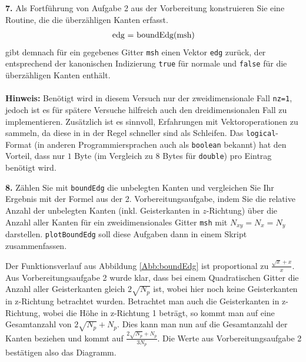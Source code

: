 \documentclass[Protokollheft.tex]{subfiles}
\begin{document}
        \begin{framed}
	\noindent \textbf{7.} Als Fortführung von Aufgabe 2 aus der Vorbereitung
                    konstruieren Sie eine Routine, die die überzähligen Kanten erfasst.
                    \begin{align}
                        \lstinline{edg = boundEdg(msh)}
                    \end{align}
                    gibt demnach für ein gegebenes Gitter \lstinline{msh} einen Vektor \lstinline{edg} zurück, der
                    entsprechend der kanonischen Indizierung \lstinline{true} für normale und \lstinline{false}
                    für die überzähligen Kanten enthält.\\
                    \ \\
                    {\textbf{Hinweis:}} Benötigt wird in diesem Versuch nur der zweidimensionale Fall \lstinline{nz=1}, jedoch ist es für spätere Versuche hilfreich auch den dreidimensionalen Fall zu implementieren. Zusätzlich ist es sinnvoll, Erfahrungen mit Vektoroperationen zu sammeln, da diese in \matlab in der Regel schneller sind als Schleifen. Das \lstinline{logical}-Format (in anderen Programmiersprachen auch als \lstinline{boolean} bekannt) hat den Vorteil, dass nur $1$ Byte (im Vergleich zu $8$ Bytes für \lstinline{double}) pro Eintrag benötigt wird.\label{exer:boundEdg}
\end{framed}


        \begin{framed}
	\noindent \textbf{8.} Zählen Sie mit \lstinline{boundEdg} die unbelegten Kanten und vergleichen Sie Ihr Ergebnis mit
                    der Formel aus der 2. Vorbereitungsaufgabe, indem Sie die relative Anzahl der
                    unbelegten Kanten (inkl. Geisterkanten in $z$-Richtung) über die Anzahl aller Kanten für ein zweidimensionales Gitter \lstinline{msh} mit $N_{xy}=N_x=N_y$ darstellen. \lstinline{plotBoundEdg} soll diese Aufgaben dann in einem Skript zusammenfassen.\label{exer:plotBoundEdg}
\end{framed}
\noindent
	Der Funktionsverlauf aus Abbildung \ref{Abb:boundEdg} ist proportional zu $\frac{\sqrt{x}+x}{x}$. Aus Vorbereitungsaufgabe 2 wurde klar, dass bei einem Quadratischen Gitter die Anzahl aller Geisterkanten gleich $2\sqrt{N_p}$ ist, wobei hier noch keine Geisterkanten in z-Richtung betrachtet wurden. Betrachtet man auch die Geisterkanten in z-Richtung, wobei die Höhe in z-Richtung 1 beträgt, so kommt man auf eine Gesamtanzahl von $2\sqrt{N_p}+N_p$. Dies kann man nun auf die Gesamtanzahl der Kanten beziehen und kommt auf $\frac{2\sqrt{N_p}+N_p}{3N_p}$. Die Werte aus Vorbereitungsaufgabe 2 bestätigen also das Diagramm.
\end{document}
